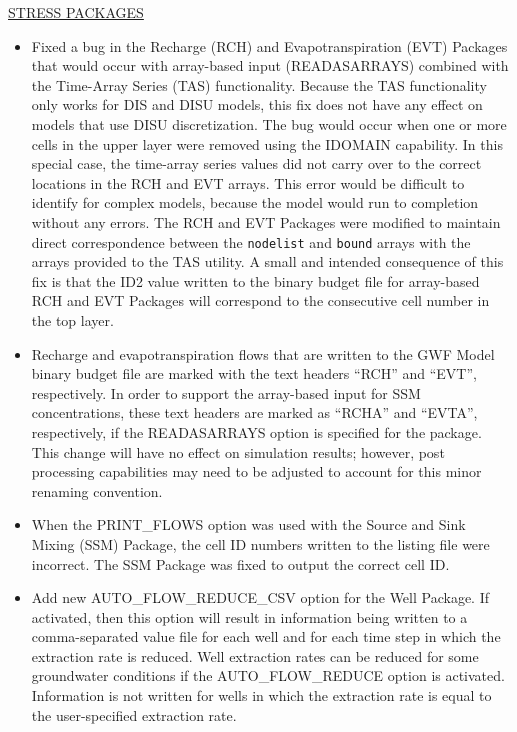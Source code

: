 \documentclass[11pt,twoside,twocolumn]{usgsreport}
\begin{document}
\begin{itemize}
	\underline{STRESS PACKAGES}
	\begin{itemize}
	        \item Fixed a bug in the Recharge (RCH) and Evapotranspiration (EVT) Packages that would occur with array-based input (READASARRAYS) combined with the Time-Array Series (TAS) functionality.  Because the TAS functionality only works for DIS and DISU models, this fix does not have any effect on models that use DISU discretization.  The bug would occur when one or more cells in the upper layer were removed using the IDOMAIN capability.  In this special case, the time-array series values did not carry over to the correct locations in the RCH and EVT arrays.  This error would be difficult to identify for complex models, because the model would run to completion without any errors.  The RCH and EVT Packages were modified to maintain direct correspondence between the \texttt{nodelist} and \texttt{bound} arrays with the arrays provided to the TAS utility.  A small and intended consequence of this fix is that the ID2 value written to the binary budget file for array-based RCH and EVT Packages will correspond to the consecutive cell number in the top layer.  
	        \item Recharge and evapotranspiration flows that are written to the GWF Model binary budget file are marked with the text headers ``RCH'' and ``EVT'', respectively.  In order to support the array-based input for SSM concentrations, these text headers are marked as ``RCHA'' and ``EVTA'', respectively, if the READASARRAYS option is specified for the package.  This change will have no effect on simulation results; however, post processing capabilities may need to be adjusted to account for this minor renaming convention.
	        \item When the PRINT\_FLOWS option was used with the Source and Sink Mixing (SSM) Package, the cell ID numbers written to the listing file were incorrect.  The SSM Package was fixed to output the correct cell ID.
	        \item Add new AUTO\_FLOW\_REDUCE\_CSV option for the Well Package.  If activated, then this option will result in information being written to a comma-separated value file for each well and for each time step in which the extraction rate is reduced.  Well extraction rates can be reduced for some groundwater conditions if the AUTO\_FLOW\_REDUCE option is activated.  Information is not written for wells in which the extraction rate is equal to the user-specified extraction rate.
	\end{itemize}


\end{itemize}
\end{document}
